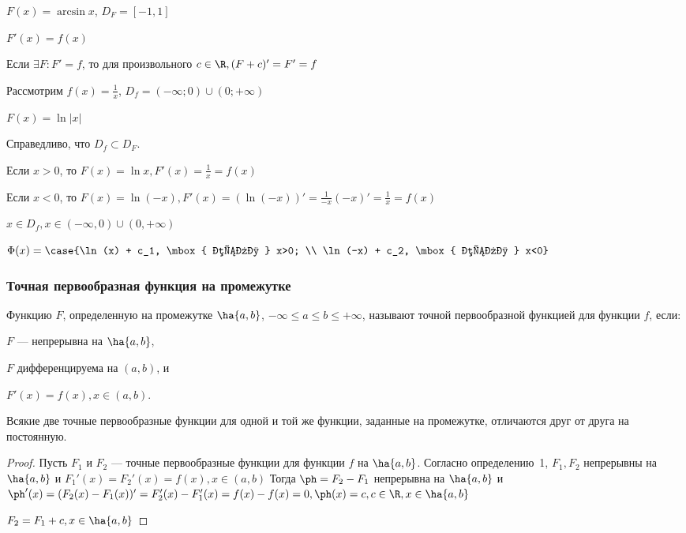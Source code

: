 \documentclass[a4paper]{article}
\begin{document}
$F(x)=\arcsin x$, $D_F=[-1,1]$

$F'(x)=f(x)$

Если $\exists F: F'=f$, то для произвольного $c\in \R, (F +
c)'=F'=f$

Рассмотрим $f(x)=\frac{1}{x}$, $D_f=(-\infty;0) \cup (0;+\infty)$
\par $F(x)=\ln |x|$ \par Справедливо, что $D_f \subset D_F$. \par
Если $x>0$, то $F(x)=\ln x, F'(x)=\frac{1}{x}=f(x)$
\par Если $x<0$, то $F(x)=\ln(-x),
F'(x)=(\ln(-x))'=\frac{1}{-x}(-x)'=\frac{1}{x}=f(x)$ \par $x \in
D_f, x \in (-\infty, 0) \cup (0,+\infty)$ \par
$\Phi(x)=\case{\ln(x) + c_1, \mbox{ если } x>0; \\ \ln(-x) + c_2,
\mbox{ если } x<0}$

\subsubsection{Точная первообразная функция на промежутке}

\begin{df*} Функцию $F$, определенную на промежутке $\ha{a,b}$, $-\infty\le a
\le b\le+\infty$, называют точной первообразной функцией для функции
$f$, если:
\begin{points}{-2}
\item $F$ --- непрерывна на $\ha{a,b}$,
\item $F$ дифференцируема на $(a,b)$, и
\item $F'(x)=f(x), x \in (a,b)$.
\end{points}
\end{df*}

\begin{theorem} Всякие две точные первообразные функции для одной и той же
функции, заданные на промежутке, отличаются друг от друга на
постоянную. \end{theorem}

\begin{proof} Пусть $F_1$ и $F_2$ --- точные первообразные функции для функции
$f$ на $\ha{a,b}$. Согласно определению~1, $F_1, F_2$ непрерывны на
$\ha{a,b}$ и $F_1'(x)=F_2'(x)=f(x), x \in (a,b)$ Тогда $\ph=F_2-F_1$
непрерывна на $\ha{a,b}$ и
$\ph'(x)=(F_2(x)-F_1(x))'=F_2'(x)-F_1'(x)=f(x)-f(x)=0, \ph(x)=c, c
\in \R, x \in \ha{a,b}$ \par $F_2=F_1 + c, x \in \ha{a,b}$
\end{proof}
\end{document}
